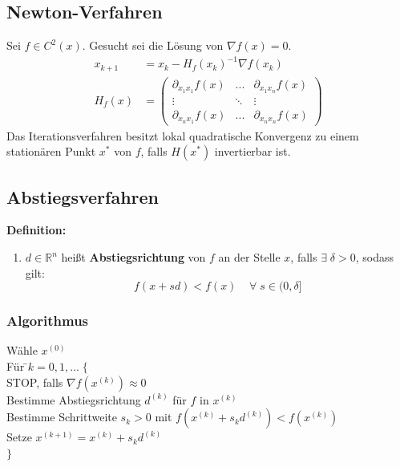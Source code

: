 \documentclass[a4paper,twocolumn,10pt]{article}
\begin{document}
\subsection{Newton-Verfahren}
Sei $f\in C^2(x)$. Gesucht sei die Lösung von $\nabla f(x)=0$.
\begin{equation*}
\begin{split}
x_{k+1}&=x_k-H_f(x_k)^{-1}\nabla f(x_k)\\
H_f(x)&=\begin{pmatrix}\partial_{x_1x_1} f(x) & ... & \partial_{x_1x_n}f(x) \\ \vdots & \ddots & \vdots \\ \partial_{x_nx_1}f(x) & ... & \partial_{x_nx_n}f(x)\end{pmatrix}
\end{split}
\end{equation*}
Das Iterationsverfahren besitzt lokal quadratische Konvergenz zu einem stationären Punkt $x^*$ von $f$, falls $H(x^*)$ invertierbar ist.

\subsection{Abstiegsverfahren}
\textbf{Definition:}
\begin{enumerate}[label=$\bullet$]
\item $d\in\mathbb{R}^n$ heißt \textbf{Abstiegsrichtung} von $f$ an der Stelle $x$, falls $\exists\;\delta>0$, sodass gilt:
\begin{equation*}
f(x+sd)<f(x)\;\;\;\;\forall\;s\in(0,\delta]
\end{equation*}
\end{enumerate}

\subsubsection{Algorithmus}
\begin{tabbing}
Wähle $x^{(0)}$\\
Für \=$k=0,1,...\;\{$\\
\> STOP, falls $\nabla f\left(x^{(k)}\right)\approx 0$\\
\> Bestimme Abstiegsrichtung $d^{(k)}$ für $f$ in $x^{(k)}$\\
\>Bestimme Schrittweite $s_k>0$ mit $f\left(x^{(k)}+s_kd^{(k)}\right)<f\left(x^{(k)}\right)$\\
\> Setze $x^{(k+1)}=x^{(k)}+s_kd^{(k)}$\\
$\}$
\end{tabbing}
\end{document}
